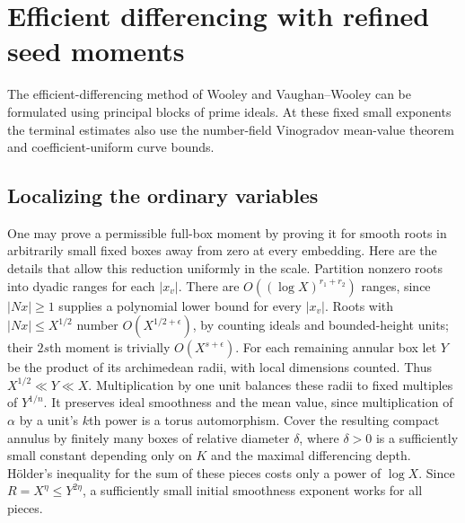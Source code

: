 \documentclass[11pt]{amsart}
\theoremstyle{definition}
\numberwithin{equation}{section}
\begin{document}
\section{Efficient differencing with refined seed moments}
\label{sec:efficient-differencing}\label{sec:g6-transfer}\label{sec:quartic-principal-blocks}
The efficient-differencing method of Wooley and Vaughan--Wooley
\cite{WooleyThesis,Wooley1992,VW1995,VW2000} can be formulated
using principal blocks of prime ideals. At these fixed small exponents
the terminal estimates also use the number-field Vinogradov mean-value
theorem and coefficient-uniform curve bounds.
\subsection{Localizing the ordinary variables}

One may prove a permissible full-box moment by proving it for smooth roots in
arbitrarily small fixed boxes away from zero at every embedding.  Here are the
details that allow this reduction uniformly in the scale.
Partition nonzero roots into dyadic ranges for each $|x_v|$.  There are
$O((\log X)^{r_1+r_2})$ ranges, since $|Nx|\ge1$ supplies a polynomial lower
bound for every $|x_v|$.  Roots with $|Nx|\le X^{1/2}$ number
$O(X^{1/2+\epsilon})$, by counting ideals and bounded-height units; their
$2s$th moment is trivially $O(X^{s+\epsilon})$.
For each remaining annular box let $Y$ be the product of its archimedean radii,
with local dimensions counted.  Thus $X^{1/2}\ll Y\ll X$.
Multiplication by one unit balances these radii to fixed multiples of $Y^{1/n}$.
It preserves ideal smoothness and the mean value, since multiplication of
$\alpha$ by a unit's $k$th power is a torus automorphism.
Cover the resulting compact annulus by finitely many boxes of relative diameter
$\delta$, where $\delta>0$ is a sufficiently small constant depending only on
$K$ and the maximal differencing depth.  H\"older's inequality for the sum of
these pieces costs only a power of $\log X$.  Since $R=X^\eta\le Y^{2\eta}$,
a sufficiently small initial smoothness exponent works for all pieces.
\end{document}
